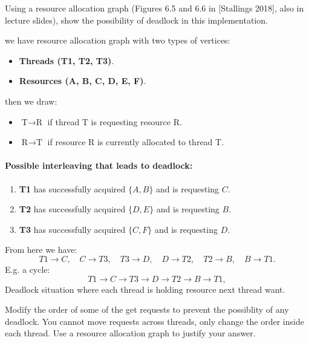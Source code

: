 \documentclass{article}
\begin{document}
\begin{enumerate}[label=\textbf{\makebox[1cm][l]{\Huge\text{(\stylishfont\alph*)}}}, leftmargin=!, labelindent=0pt]
    \item Using a resource allocation graph (Figures 6.5 and 6.6 in [Stallings 2018],
    also in lecture slides), show the possibility of deadlock in this implementation.\newline

    we have resource allocation graph with two types of vertices:
\begin{itemize}
    \item \textbf{Threads (T1, T2, T3)}.
    \item \textbf{Resources (A, B, C, D, E, F)}.
\end{itemize}
then we draw:
\begin{itemize}
    \item \(\text{T} \rightarrow \text{R}\) if thread T is requesting resource R.
    \item \(\text{R} \rightarrow \text{T}\) if resource R is currently allocated to thread T.
\end{itemize}

\paragraph{Possible interleaving that leads to deadlock:}
\begin{enumerate}
    \item \textbf{T1} has successfully acquired \(\{A, B\}\) and is requesting \(C\).
    \item \textbf{T2} has successfully acquired \(\{D, E\}\) and is requesting \(B\).
    \item \textbf{T3} has successfully acquired \(\{C, F\}\) and is requesting \(D\).
\end{enumerate}
From here we have:
\[
T1 \rightarrow C, \quad
C \rightarrow T3, \quad
T3 \rightarrow D, \quad
D \rightarrow T2, \quad
T2 \rightarrow B, \quad
B \rightarrow T1.
\]
E.g. a cycle:
\[
T1 \rightarrow C \rightarrow T3 \rightarrow D \rightarrow T2 \rightarrow B \rightarrow T1,
\]
Deadlock situation where each thread is holding resource next thread want.

\newpage
    \item Modify the order of some of the get requests to prevent the possiblity of any deadlock.
    You cannot move requests across threads, only change the order inside each thread. Use a
    resource allocation graph to justify your answer.\newline


\end{enumerate}
\end{document}
